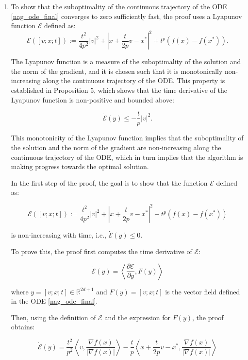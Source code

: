 \begin{enumerate}

    \item To show that the suboptimality of the continuous trajectory of the ODE \eqref{nag_ode_final} converges to zero sufficiently fast, the proof uses a Lyapunov function $\mathcal{E}$ defined as:
          $$
              \mathcal{E}([v ; x ; t]):=\frac{t^{2}}{4 p^{2}}|v|^{2}+\left|x+\frac{t}{2 p} v-x^*{}\right|^{2}+t^{p}\left(f(x)-f\left(x^{*}\right)\right) .
          $$

          The Lyapunov function is a measure of the suboptimality of the solution and the norm of the gradient, and it is chosen such that it is monotonically non-increasing along the continuous trajectory of the ODE. This property is established in Proposition 5, which shows that the time derivative of the Lyapunov function is non-positive and bounded above:

          $$
              \dot{\mathcal{E}}(y) \leq-\frac{t}{p}|v|^{2} .
          $$

          This monotonicity of the Lyapunov function implies that the suboptimality of the solution and the norm of the gradient are non-increasing along the continuous trajectory of the ODE, which in turn implies that the algorithm is making progress towards the optimal solution.

          In the first step of the proof, the goal is to show that the function $\mathcal{E}$ defined as:

          $$
              \mathcal{E}([v ; x ; t]) := \frac{t^2}{4p^2} |v|^2 + |x + \frac{t}{2p} v - x^*|^2 + t^p (f(x) - f(x^*))
          $$

          is non-increasing with time, i.e., $\dot{\mathcal{E}}(y) \le 0$.

          To prove this, the proof first computes the time derivative of $\mathcal{E}$:

          $$
              \dot{\mathcal{E}}(y) = \left\langle \frac{\partial \mathcal{E}}{\partial y}, F(y) \right\rangle
          $$

          where $y = [v; x; t] \in \mathbb{R}^{2d+1}$ and $F(y) = [v; x; t]$ is the vector field defined in the ODE \eqref{nag_ode_final}.

          Then, using the definition of $\mathcal{E}$ and the expression for $F(y)$, the proof obtains:

          $$
              \dot{\mathcal{E}}(y) = \frac{t^2}{p^2} \left\langle v, \frac{\nabla f(x)}{|\nabla f(x)|} \right\rangle - \frac{t}{p} \left\langle x + \frac{t}{2p} v - x^*, \frac{\nabla f(x)}{|\nabla f(x)|} \right\rangle
          $$


\end{enumerate}
